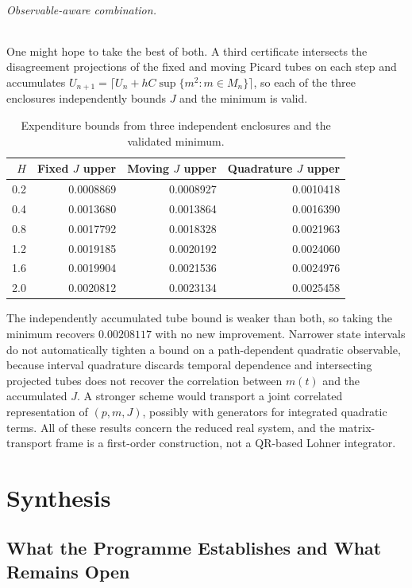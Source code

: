 \documentclass[11pt,notitlepage]{report}
\theoremstyle{definition}
\theoremstyle{remark}
\begin{document}
\paragraph{Observable-aware combination.} One might hope to take the best of both. A third certificate intersects the disagreement projections of the fixed and moving Picard tubes on each step and accumulates $U_{n+1}=\lceil U_n+hC\sup\{m^2:m\in M_n\}\rceil$, so each of the three enclosures independently bounds $J$ and the minimum is valid.
\begin{table}[ht]\centering\small
\caption{Expenditure bounds from three independent enclosures and the validated minimum.}
\begin{tabular}{rrrr}\toprule
$H$&Fixed $J$ upper&Moving $J$ upper&Quadrature $J$ upper\\\midrule
0.2&0.0008869&0.0008927&0.0010418\\
0.4&0.0013680&0.0013864&0.0016390\\
0.8&0.0017792&0.0018328&0.0021963\\
1.2&0.0019185&0.0020192&0.0024060\\
1.6&0.0019904&0.0021536&0.0024976\\
2.0&0.0020812&0.0023134&0.0025458\\\bottomrule
\end{tabular}
\end{table}
The independently accumulated tube bound is weaker than both, so taking the minimum recovers $0.00208117$ with no new improvement. Narrower state intervals do not automatically tighten a bound on a path-dependent quadratic observable, because interval quadrature discards temporal dependence and intersecting projected tubes does not recover the correlation between $m(t)$ and the accumulated $J$. A stronger scheme would transport a joint correlated representation of $(p,m,J)$, possibly with generators for integrated quadratic terms. All of these results concern the reduced real system, and the matrix-transport frame is a first-order construction, not a QR-based Lohner integrator.
\part{Synthesis}

\chapter{What the Programme Establishes and What Remains Open}\label{ch:synthesis}
\end{document}
